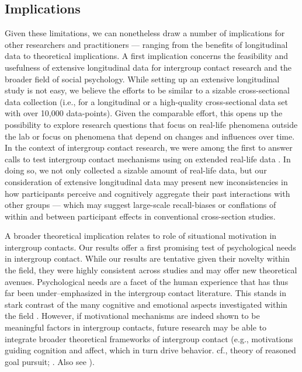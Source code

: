 \documentclass[man, 12pt, a4paper, mask]{apa7}
\theoremstyle{break}
\theoremstyle{plain}
\begin{document}
\subsection{Implications}
Given these limitations, we can nonetheless draw a number of implications for other researchers and practitioners --- ranging from the benefits of longitudinal data to theoretical implications. A first implication concerns the feasibility and usefulness of extensive longitudinal data for intergroup contact research and the broader field of social psychology. While setting up an extensive longitudinal study is not easy, we believe the efforts to be similar to a sizable cross-sectional data collection (i.e., for a longitudinal or a high-quality cross-sectional data set with over 10,000 data-points). Given the comparable effort, this opens up the possibility to explore research questions that focus on real-life phenomena outside the lab or focus on phenomena that depend on changes and influences over time. In the context of intergroup contact research, we were among the first to answer calls to test intergroup contact mechanisms using on extended real-life data \citep[e.g.,][]{Pettigrew2011, MacInnis2015}. In doing so, we not only collected a sizable amount of real-life data, but our consideration of extensive longitudinal data may present new inconsistencies in how participants perceive and cognitively aggregate their past interactions with other groups — which may suggest large-scale recall-biases or conflations of within and between participant effects in conventional cross-section studies.

A broader theoretical implication relates to role of situational motivation in intergroup contacts. Our results offer a first promising test of psychological needs in intergroup contact. While our results are tentative given their novelty within the field, they were highly consistent across studies and may offer new theoretical avenues. Psychological needs are a facet of the human experience that has thus far been under–emphasized in the intergroup contact literature. This stands in stark contrast of the many cognitive \citep[e.g.,][]{Pettigrew1998, Brown2005} and emotional aspects investigated within the field \citep[e.g.,][]{Stephan2008, Paolini2004}. However, if motivational mechanisms are indeed shown to be meaningful factors in intergroup contacts, future research may be able to integrate broader theoretical frameworks of intergroup contact (e.g., motivations guiding cognition and affect, which in turn drive behavior. cf., theory of reasoned goal pursuit; \citealp{Ajzen2019}. Also see \citealp{Kreienkamp2022d}). 
\end{document}
